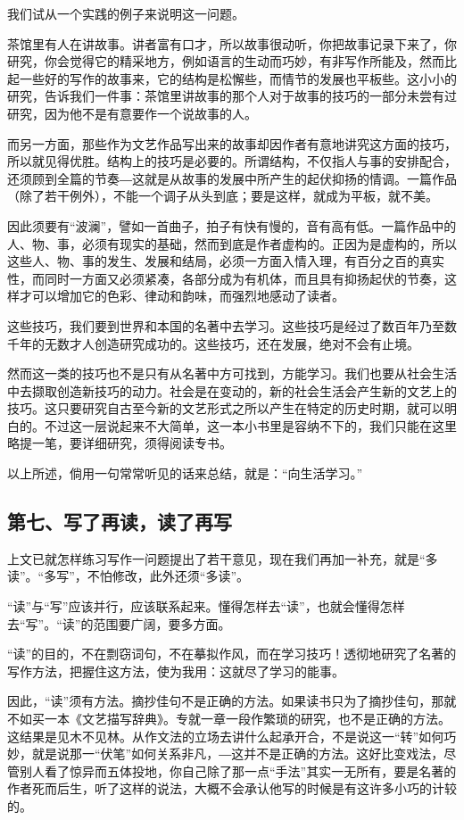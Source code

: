 \documentclass[12pt,a5paper]{ctexbook}
\begin{document}
我们试从一个实践的例子来说明这一问题。

茶馆里有人在讲故事。讲者富有口才，所以故事很动听，你把故事记录下来了，你研究，你会觉得它的精采地方，例如语言的生动而巧妙，有非写作所能及，然而比起一些好的写作的故事来，它的结构是松懈些，而情节的发展也平板些。这小小的研究，告诉我们一件事：茶馆里讲故事的那个人对于故事的技巧的一部分未尝有过研究，因为他不是有意要作一个说故事的人。

而另一方面，那些作为文艺作品写出来的故事却因作者有意地讲究这方面的技巧，所以就见得优胜。结构上的技巧是必要的。所谓结构，不仅指人与事的安排配合，还须顾到全篇的节奏―这就是从故事的发展中所产生的起伏抑扬的情调。一篇作品（除了若干例外），不能一个调子从头到底；要是这样，就成为平板，就不美。

因此须要有“波澜”，譬如一首曲子，拍子有快有慢的，音有高有低。一篇作品中的人、物、事，必须有现实的基础，然而到底是作者虚构的。正因为是虚构的，所以这些人、物、事的发生、发展和结局，必须一方面入情入理，有百分之百的真实性，而同时一方面又必须紧凑，各部分成为有机体，而且具有抑扬起伏的节奏，这样才可以增加它的色彩、律动和韵味，而强烈地感动了读者。

这些技巧，我们要到世界和本国的名著中去学习。这些技巧是经过了数百年乃至数千年的无数才人创造研究成功的。这些技巧，还在发展，绝对不会有止境。

然而这一类的技巧也不是只有从名著中方可找到，方能学习。我们也要从社会生活中去撷取创造新技巧的动力。社会是在变动的，新的社会生活会产生新的文艺上的技巧。这只要研究自古至今新的文艺形式之所以产生在特定的历史时期，就可以明白的。不过这一层说起来不大简单，这一本小书里是容纳不下的，我们只能在这里略提一笔，要详细研究，须得阅读专书。

以上所述，倘用一句常常听见的话来总结，就是：“向生活学习。”

\subsection{第七、写了再读，读了再写}
上文已就怎样练习写作一问题提出了若干意见，现在我们再加一补充，就是“多读”。“多写”，不怕修改，此外还须“多读”。

“读”与“写”应该并行，应该联系起来。懂得怎样去“读”，也就会懂得怎样去“写”。“读”的范围要广阔，要多方面。

“读”的目的，不在剽窃词句，不在摹拟作风，而在学习技巧！透彻地研究了名著的写作方法，把握住这方法，使为我用：这就尽了学习的能事。

因此，“读”须有方法。摘抄佳句不是正确的方法。如果读书只为了摘抄佳句，那就不如买一本《文艺描写辞典》。专就一章一段作繁琐的研究，也不是正确的方法。这结果是见木不见林。从作文法的立场去讲什么起承开合，不是说这一“转”如何巧妙，就是说那一“伏笔”如何关系非凡，―这并不是正确的方法。这好比变戏法，尽管别人看了惊异而五体投地，你自己除了那一点“手法”其实一无所有，要是名著的作者死而后生，听了这样的说法，大概不会承认他写的时候是有这许多小巧的计较的。
\end{document}
